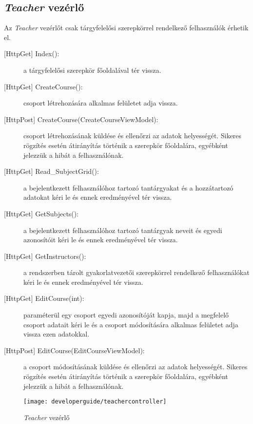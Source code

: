 \subsection{\emph{Teacher} vezérlő}
Az \emph{Teacher} vezérlőt csak tárgyfelelősi szerepkörrel rendelkező felhasználók érhetik el.
\begin{description}
	\item[{[HttpGet]} Index():] a tárgyfelelősi szerepkör főoldalával tér vissza.
	\item[{[HttpGet]} CreateCourse():] csoport létrehozására alkalmas felületet adja vissza.
	\item[{[HttpPost]} CreateCourse(CreateCourseViewModel):] csoport létrehozásának küldése és ellenőrzi az adatok helyességét. Sikeres rögzítés esetén átirányítás történik a szerepkör főoldalára, egyébként jelezzük a hibát a felhasználónak.
	\item[{[HttpGet]} Read\_SubjectGrid():] a bejelentkezett felhasználóhoz tartozó tantárgyakat és a hozzátartozó adatokat kéri le és ennek eredményével tér vissza.
	\item[{[HttpGet]} GetSubjects():] a bejelentkezett felhasználóhoz tartozó tantárgyak neveit és egyedi azonosítóit kéri le és ennek eredményével tér vissza.
	\item[{[HttpGet]} GetInstructors():] a rendszerben tárolt gyakorlatvezetői szerepkörrel rendelkező felhasználókat kéri le és ennek eredményével tér vissza.
	\item[{[HttpGet]} EditCourse(int):] paraméterül egy csoport egyedi azonosítóját kapja, majd a megfelelő csoport adatait kéri le és a csoport módosítására alkalmas felületet adja vissza ezen adatokkal.
	\item[{[HttpPost]} EditCourse(EditCourseViewModel):] a csoport módosításának küldése és ellenőrzi az adatok helyességét. Sikeres rögzítés esetén átirányítás történik a szerepkör főoldalára, egyébként jelezzük a hibát a felhasználónak.
\end{description}
\begin{figure}[H]
	\centering
	\texttt{[image: developerguide/teachercontroller]}
	\caption{\emph{Teacher} vezérlő}
	\label{fig:teachercontroller}
\end{figure}
